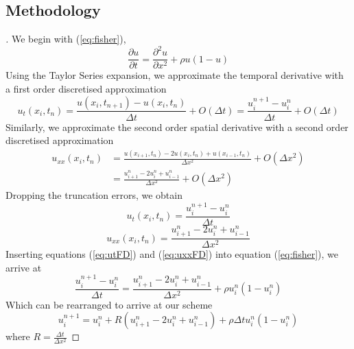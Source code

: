 \documentclass[a4paper]{article}
\begin{document}
	\subsection{Methodology}\label{sec:FDmethods}
	\begin{proof}[]
		We begin with (\ref{eq:fisher}),
		\begin{equation*}
		    \frac{\partial u}{\partial t} = \frac{\partial^2 u}{\partial x^2} + \rho u(1-u)
		\end{equation*}
		Using the Taylor Series expansion, we approximate the temporal derivative with a first order discretised approximation
		\begin{equation*}
		    u_{t}(x_{i},t_{n}) = \frac{u(x_{i},t_{n+1})-u(x_{i},t_{n})}{\Delta t} + O(\Delta t) = \frac{u_{i}^{n+1}-u_{i}^{n}}{\Delta t} + O(\Delta t)
		\end{equation*}
		Similarly, we approximate the second order spatial derivative with a second order discretised approximation
		\begin{equation*}
		\begin{split}
		    u_{xx}(x_{i},t_{n}) & = \frac{u(x_{i+1},t_{n})-2u(x_{i},t_{n})+u(x_{i-1},t_{n})}{\Delta x^2} + O(\Delta x^2) \\
		    & = \frac{u_{i+1}^{n}-2u_{i}^{n}+u_{i-1}^{n}}{\Delta x^2} + O(\Delta x^2)
		\end{split}
		\end{equation*}
		Dropping the truncation errors, we obtain
		\begin{equation}\label{eq:utFD}
		    u_{t}(x_{i},t_{n}) = \frac{u_{i}^{n+1}-u_{i}^{n}}{\Delta t}
		\end{equation}
		\begin{equation}\label{eq:uxxFD}
		    u_{xx}(x_{i},t_{n}) = \frac{u_{i+1}^{n}-2u_{i}^{n}+u_{i-1}^{n}}{\Delta x^2}
		\end{equation}
		Inserting equations (\ref{eq:utFD}) and (\ref{eq:uxxFD}) into equation (\ref{eq:fisher}), we arrive at
		\begin{equation}\label{eq:almostFiniteScheme}
		    \frac{u_{i}^{n+1}-u_{i}^{n}}{\Delta t} = \frac{u_{i+1}^{n}-2u_{i}^{n}+u_{i-1}^{n}}{\Delta x^2} + \rho u_{i}^{n}(1-u_{i}^{n})
		\end{equation}
		Which can be rearranged to arrive at our scheme
		\begin{equation}\label{eq:finiteScheme}
		    u_{i}^{n+1} = u_{i}^{n} + R(u_{i+1}^{n}-2u_{i}^{n}+u_{i-1}^{n}) + \rho \Delta t u_{i}^{n}(1-u_{i}^{n})
		\end{equation}
		where $R = \frac{\Delta t}{\Delta x^2}$
		

\end{proof}
\end{document}
